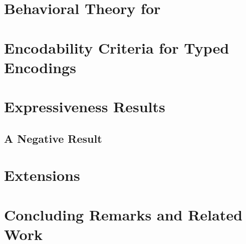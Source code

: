\documentclass[runningheads]{llncs}
\begin{document}



\section{Behavioral Theory for \HOp}\label{sec:bt}


%



\section{Encodability Criteria for Typed Encodings}
\label{s:expr}


\section{Expressiveness Results}
\label{sec:positive}


\subsection{A Negative Result}
\label{ss:negative}


\section{Extensions}
\label{sec:extension}





%

\section{Concluding Remarks and Related Work}
\label{sec:relwork}


%
\end{document}

